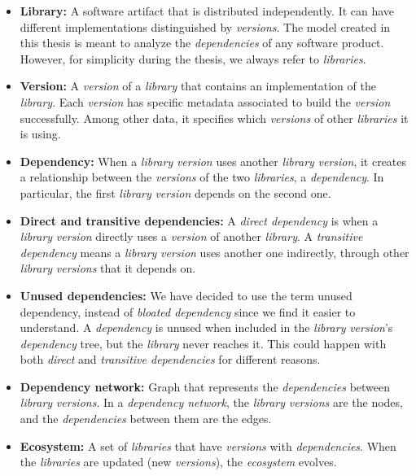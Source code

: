 \begin{itemize}
  \item \textbf{Library:} A software artifact that is distributed independently. It can have different implementations distinguished by \textit{versions}. The model created in this thesis is meant to analyze the \textit{dependencies} of any software product. However, for simplicity during the thesis, we always refer to \textit{libraries}.

  \item \textbf{Version:} A \textit{version} of a \textit{library} that contains an implementation of the \textit{library}. Each \textit{version} has specific metadata associated to build the \textit{version} successfully. Among other data, it specifies which \textit{versions} of other \textit{libraries} it is using.

  \item \textbf{Dependency:} When a \textit{library} \textit{version} uses another \textit{library} \textit{version}, it creates a relationship between the \textit{versions} of the two \textit{libraries}, a \textit{dependency}. In particular, the first \textit{library} \textit{version} depends on the second one.

  \item \textbf{Direct and transitive dependencies:} A \textit{direct dependency} is when a \textit{library} \textit{version} directly uses a \textit{version} of another \textit{library}. A \textit{transitive dependency} means a \textit{library} \textit{version} uses another one indirectly, through other \textit{library} \textit{versions} that it depends on.

  \item \textbf{Unused dependencies:} We have decided to use the term unused dependency, instead of \textit{bloated dependency} since we find it easier to understand. A \textit{dependency} is unused when included in the \textit{library} \textit{version}'s \textit{dependency} tree, but the \textit{library} never reaches it. This could happen with both \textit{direct} and \textit{transitive dependencies} for different reasons.

  \item \textbf{Dependency network:} Graph that represents the \textit{dependencies} between \textit{library} \textit{versions}. In a \textit{dependency network}, the \textit{library} \textit{versions} are the nodes, and the \textit{dependencies} between them are the edges.

  \item \textbf{Ecosystem:} A set of \textit{libraries} that have \textit{versions} with \textit{dependencies}. When the \textit{libraries} are updated (new \textit{versions}), the \textit{ecosystem} evolves.
\end{itemize}

